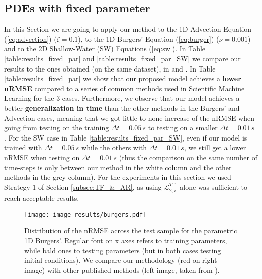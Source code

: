 \subsection{PDEs with fixed parameter}
\label{subsec:PDE_fixed}
In this Section we are going to apply our method to the 1D Advection Equation (\ref{eq:advection}) ($\zeta =0.1$), to the 1D Burgers' Equation (\ref{eq:burger}) ($\nu=0.001$) and to the 2D Shallow-Water (SW) Equations (\ref{eq:sw}).
In Table \ref{table:results_fixed_par} and \ref{table:results_fixed_par_SW} we compare our results to the ones obtained (on the same dataset), in \cite{takamoto2022pdebench} and \cite{vcnef-hagnberger:2024}. In Table \ref{table:results_fixed_par} we show that our proposed model achieves a \textbf{lower nRMSE} compared to a series of common methods used in Scientific Machine Learning for the $3$ cases. Furthermore, we observe that our model achieves a better \textbf{generalization in time} than the other methods in the Burgers' and Advection cases, meaning that we got little to none increase of the nRMSE when going from testing on the training $\Delta t=0.05\,s$ to testing on a smaller $\Delta t = 0.01\,s$ . For the SW case in Table \ref{table:results_fixed_par_SW}, even if our model is trained with $\Delta t = 0.05\,s$ while the others with $\Delta t = 0.01\,s$, we still get a lower nRMSE when testing on $\Delta t = 0.01\,s$ (thus the comparison on the same number of time-steps is only between our method in the white column and the other methods in the grey column). For the experiments in this section we used Strategy $1$ of Section \ref{subsec:TF_&_AR}, as using $\mathcal{L}_{2,i}^{T,1}$ alone was sufficient to reach acceptable results.
\begin{figure*}
  \centering
  \texttt{[image: image\_results/burgers.pdf]}
  \caption{Distribution of the nRMSE across the test sample for the parametric 1D Burgers'. Regular font on x axes refers to training parameters, while bald ones to testing parameters (but in both cases testing initial conditions). We compare our methodology (red on right image) with other published methods (left image, taken from \cite{vcnef-hagnberger:2024}).}
  \label{fig:burger_parametric}
\end{figure*}
